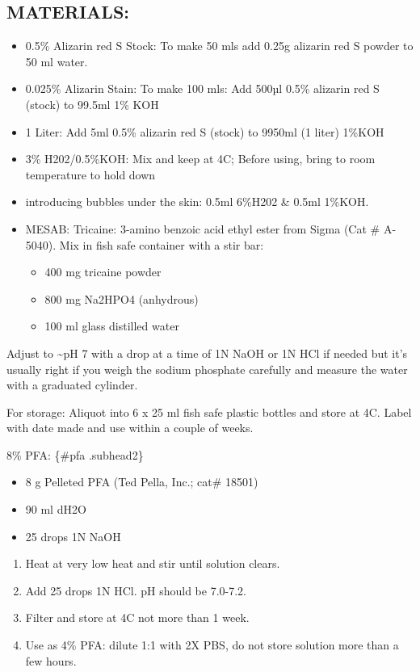 \documentclass[
]{book}
\providecommand{\tightlist}{%
  \setlength{\itemsep}{0pt}\setlength{\parskip}{0pt}}
\begin{document}
\hypertarget{materials}{%
\subsection{MATERIALS:}\label{materials}}

\begin{itemize}
\tightlist
\item
  0.5\% Alizarin red S Stock: To make 50 mls add 0.25g alizarin red S powder to 50 ml water.
\item
  0.025\% Alizarin Stain: To make 100 mls: Add 500µl 0.5\% alizarin red S (stock) to 99.5ml 1\% KOH
\item
  1 Liter: Add 5ml 0.5\% alizarin red S (stock) to 9950ml (1 liter) 1\%KOH
\item
  3\% H202/0.5\%KOH: Mix and keep at 4C; Before using, bring to room temperature to hold down
\item
  introducing bubbles under the skin: 0.5ml 6\%H202 \& 0.5ml 1\%KOH.
\item
  MESAB: Tricaine: 3-amino benzoic acid ethyl ester from Sigma (Cat \# A-5040). Mix in fish safe container with a stir bar:

  \begin{itemize}
  \tightlist
  \item
    400 mg tricaine powder
  \item
    800 mg Na2HPO4 (anhydrous)
  \item
    100 ml glass distilled water
  \end{itemize}
\end{itemize}

Adjust to \textasciitilde pH 7 with a drop at a time of 1N NaOH or 1N HCl if needed
but it's usually right if you weigh the sodium phosphate carefully and
measure the water with a graduated cylinder.

For storage: Aliquot into 6 x 25 ml fish safe plastic bottles and store
at 4C. Label with date made and use within a couple of weeks.

8\% PFA: \{\#pfa .subhead2\}

\begin{itemize}
\tightlist
\item
  8 g Pelleted PFA (Ted Pella, Inc.; cat\# 18501)
\item
  90 ml dH2O
\item
  25 drops 1N NaOH
\end{itemize}

\begin{enumerate}
\def\labelenumi{\arabic{enumi}.}
\tightlist
\item
  Heat at very low heat and stir until solution clears.
\item
  Add 25 drops 1N HCl. pH should be 7.0-7.2.
\item
  Filter and store at 4C not more than 1 week.
\item
  Use as 4\% PFA: dilute 1:1 with 2X PBS, do not store solution more
  than a few hours.
\end{enumerate}
\end{document}

